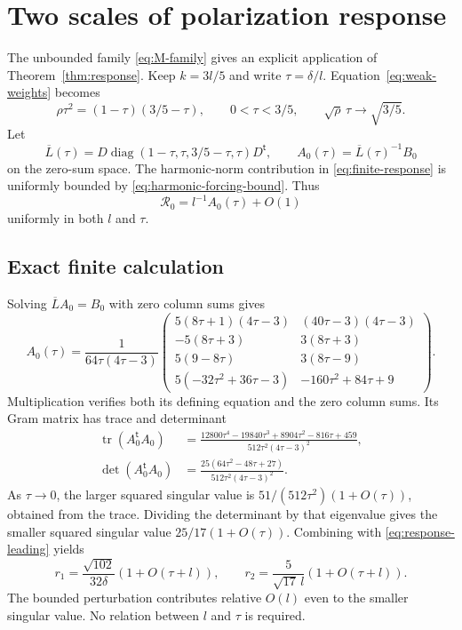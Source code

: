 \documentclass[11pt]{amsart}
\theoremstyle{definition}
\theoremstyle{remark}
\newcommand{\tr}{\operatorname{tr}}
\newcommand{\diag}{\operatorname{diag}}
\newcommand{\cR}{\mathcal R}
\begin{document}
\section{Two scales of polarization response}\label{sec:response-scales}

The unbounded family \eqref{eq:M-family} gives an explicit application of
Theorem~\ref{thm:response}. Keep $k=3l/5$ and write $\tau=\delta/l$.
Equation~\eqref{eq:weak-weights} becomes
\begin{equation}\label{eq:tau-relation}
 \rho\tau^2=(1-\tau)(3/5-\tau),\qquad
 0<\tau<3/5,\qquad \sqrt\rho\,\tau\longrightarrow\sqrt{3/5}.
\end{equation}
Let
\[
 \overline L(\tau)=D\diag(1-\tau,\tau,3/5-\tau,\tau)D^{\mathsf t},
 \qquad A_0(\tau)=\overline L(\tau)^{-1}B_0
\]
on the zero-sum space. The harmonic-norm contribution in
\eqref{eq:finite-response} is uniformly bounded by
\eqref{eq:harmonic-forcing-bound}. Thus
\begin{equation}\label{eq:response-leading}
 \cR_0=l^{-1}A_0(\tau)+O(1)
\end{equation}
uniformly in both $l$ and $\tau$.

\subsection{Exact finite calculation}
Solving $\overline LA_0=B_0$ with zero column sums gives
\begin{equation}\label{eq:A0-explicit}
 A_0(\tau)=\frac1{64\tau(4\tau-3)}
 \begin{pmatrix}
 5(8\tau+1)(4\tau-3)&(40\tau-3)(4\tau-3)\\
 -5(8\tau+3)&3(8\tau+3)\\
 5(9-8\tau)&3(8\tau-9)\\
 5(-32\tau^2+36\tau-3)&-160\tau^2+84\tau+9
 \end{pmatrix}.
\end{equation}
Multiplication verifies both its defining equation and the zero column
sums. Its Gram matrix has trace and determinant
\begin{align}
 \tr(A_0^{\mathsf t}A_0)
 &=\frac{12800\tau^4-19840\tau^3+8904\tau^2-816\tau+459}
 {512\tau^2(4\tau-3)^2},\label{eq:response-gram-trace}\\
 \det(A_0^{\mathsf t}A_0)
 &=\frac{25(64\tau^2-48\tau+27)}{512\tau^2(4\tau-3)^2}.
 \label{eq:response-gram-det}
\end{align}
As $\tau\to0$, the larger squared singular value is
$51/(512\tau^2)(1+O(\tau))$, obtained from the trace. Dividing the
determinant by that eigenvalue gives the smaller squared singular value
$25/17(1+O(\tau))$. Combining with \eqref{eq:response-leading} yields
\begin{equation}\label{eq:finite-two-scales}
 r_1=\frac{\sqrt{102}}{32\delta}(1+O(\tau+l)),\qquad
 r_2=\frac5{\sqrt{17}\,l}(1+O(\tau+l)).
\end{equation}
The bounded perturbation contributes relative $O(l)$ even to the smaller
singular value. No relation between $l$ and $\tau$ is required.
\end{document}
